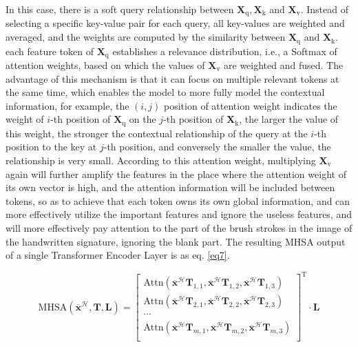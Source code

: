 In this case, there is a soft query relationship between $\boldsymbol{X}_\text{q}, \boldsymbol{X}_\text{k}$ and $\boldsymbol{X}_\text{v}$. Instead of selecting a specific key-value pair for each query, all key-values are weighted and averaged, and the weights are computed by the similarity between $\boldsymbol{X}_\text{q}$ and $\boldsymbol{X}_\text{k}$. each feature token of $\boldsymbol{X}_\text{q}$ establishes a relevance distribution, i.e., a Softmax \cite{37} of attention weights, based on which the values of $\boldsymbol{X}_\text{v}$ are weighted and fused. The advantage of this mechanism is that it can focus on multiple relevant tokens at the same time, which enables the model to more fully model the contextual information, for example, the $(i, j)$ position of attention weight indicates the weight of $i$-th position of $\boldsymbol{X}_\text{q}$ on the $j$-th position of $\boldsymbol{X}_\text{k}$, the larger the value of this weight, the stronger the contextual relationship of the query at the $i$-th position to the key at $j$-th position, and conversely the smaller the value, the relationship is very small. According to this attention weight, multiplying $\boldsymbol{X}_\text{v}$ again will further amplify the features in the place where the attention weight of its own vector is high, and the attention information will be included between tokens, so as to achieve that each token owns its own global information, and can more effectively utilize the important features and ignore the useless features, and will more effectively pay attention to the part of the brush strokes in the image of the handwritten signature, ignoring the blank part. The resulting MHSA output of a single Transformer Encoder Layer is as eq. \ref{eq7}.

\begin{equation}
\label{eq7}
\text{MHSA}(\overline{\boldsymbol{x}}^\mathcal{H},\mathbf{T},\mathbf{L}) =
\begin{bmatrix}
  \text{Attn}(\overline{\boldsymbol{x}}^\mathcal{H} \mathbf{T}_{1,1},\overline{\boldsymbol{x}}^\mathcal{H} \mathbf{T}_{1,2},\overline{\boldsymbol{x}}^\mathcal{H} \mathbf{T}_{1,3}) \\
  \text{Attn}(\overline{\boldsymbol{x}}^\mathcal{H} \mathbf{T}_{2,1},\overline{\boldsymbol{x}}^\mathcal{H} \mathbf{T}_{2,2},\overline{\boldsymbol{x}}^\mathcal{H} \mathbf{T}_{2,3}) \\
  \cdots \\
  \text{Attn}(\overline{\boldsymbol{x}}^\mathcal{H} \mathbf{T}_{m,1},\overline{\boldsymbol{x}}^\mathcal{H} \mathbf{T}_{m,2},\overline{\boldsymbol{x}}^\mathcal{H} \mathbf{T}_{m,3}) \\
\end{bmatrix}^{\mathrm{T}}
\cdot \mathbf{L} 
\end{equation}

